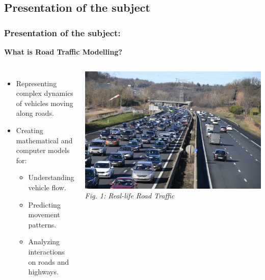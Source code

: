 \documentclass{beamer}
\begin{document}
\begin{frame}
        \subsection{Presentation of the subject}
	\frametitle{Presentation of the subject:}
        \begin{center}
        \textbf{What is Road Traffic Modelling?}
         \end{center}
	
        
	\begin{columns}
		\begin{itemize}
			\item Representing complex dynamics of vehicles moving along roads.
			\item Creating mathematical and computer models for:
			\begin{itemize}
				\item Understanding vehicle flow.
				\item Predicting movement patterns.
				\item Analyzing interactions on roads and highways.
			\end{itemize}
		\end{itemize}
		
		\begin{center}
			\includegraphics[width=\textwidth]{PIC1.jpg}
			\tiny{\textit{Fig. 1: Real-life Road Traffic}}
		\end{center}
	\end{columns}
\end{frame}
\end{document}
